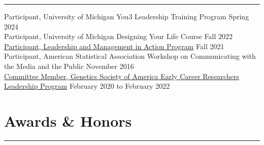 \documentclass[
  10pt,
]
{article}
\begin{document}
\hrule

\normalsize Participant, University of Michigan You3 Leadership Training
Program \hfill Spring 2024\\
\normalsize Participant, University of Michigan Designing Your Life
Course \hfill Fall 2022\\
\normalsize \href{https://drive.google.com/file/d/1xp9-gjLDxlrPtHyF4FqTf9_q0-aL47av/view}{Participant,
Leadership and Management in Action Program} \hfill Fall 2021\\
\normalsize Participant, American Statistical Association Workshop on
Communicating with the Media and the Public \hfill November 2016\\
\normalsize \href{https://genetics-gsa.org/career-development/early-career-leadership/}{Committee
Member, Genetics Society of America Early Career Researchers Leadership
Program} \hfill February 2020 to February 2022

\section{Awards \& Honors}\label{awards-honors}

\hrule
\end{document}
